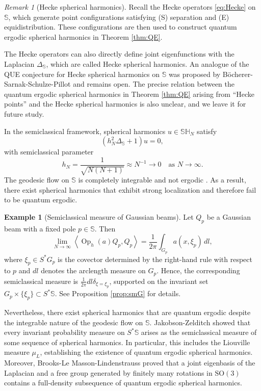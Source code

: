 \documentclass[12pt,reqno]{amsart}
\DeclareMathOperator{\Op}{Op}
\newcommand{\Sb}{\mathbb{S}}
\newcommand{\SH}{\mathbb{SH}}
\newcommand{\SO}{\mathrm{SO}}
\theoremstyle{plain}
\theoremstyle{definition}
\newtheorem*{ex}{Example}
\theoremstyle{remark}
\newtheorem*{rmk}{Remark}
\numberwithin{equation}{section}
\begin{document}
\begin{rmk}[Hecke spherical harmonics]
Recall the Hecke operators \eqref{eq:Hecke} on $\Sb$, which generate point configurations satisfying (S) separation and (E) equidistribution. These configurations are then used to construct quantum ergodic spherical harmonics in Theorem \ref{thm:QE}.

The Hecke operators can also directly define joint eigenfunctions with the Laplacian $\Delta_\Sb$, which are called Hecke spherical harmonics. An analogue of the QUE conjecture for Hecke spherical harmonics on $\Sb$ was proposed by B\"ocherer-Sarnak-Schulze-Pillot \cite[Conjecture 1]{BSSP} and remains open. The precise relation between the quantum ergodic spherical harmonics in Theorem \ref{thm:QE} arising from ``Hecke points'' and the Hecke spherical harmonics is also unclear, and we leave it for future study.
\end{rmk}

In the semiclassical framework, spherical harmonics $u\in\SH_N$ satisfy
$$\left(h_N^2\Delta_{\Sb}+1\right)u=0,$$ 
with semiclassical parameter
$$h_N=\frac{1}{\sqrt{N(N+1)}}\approx N^{-1}\to0\quad\text{as }N\to\infty.$$ 
The geodesic flow on $\Sb$ is completely integrable and not ergodic \cite{KH}. As a result, there exist spherical harmonics that exhibit strong localization and therefore fail to be quantum ergodic.

\begin{ex}[Semiclassical measure of Gaussian beams]
Let $Q_p$ be a Gaussian beam with a fixed pole $p\in\Sb$. Then
$$\lim_{N\to\infty}\left\langle\Op_h(a)Q_p,Q_p\right\rangle=\frac{1}{2\pi}\int_{G_p}a\left(x,\xi_p\right)\,dl,$$
where $\xi_p\in S^*G_p$ is the covector determined by the right-hand rule with respect to $p$ and $dl$ denotes the arclength measure on $G_p$. Hence, the corresponding semiclassical measure is $\frac{1}{2\pi}dl\delta_{\xi=\xi_p}$, supported on the invariant set $G_p\times\{\xi_p\}\subset S^*\Sb$. See Proposition \ref{prop:smG} for details.
\end{ex}

Nevertheless, there exist spherical harmonics that are quantum ergodic despite the integrable nature of the geodesic flow on $\Sb$. Jakobson-Zelditch \cite{JZ} showed that every invariant probability measure on $S^*\Sb$ arises as the semiclassical measure of some sequence of spherical harmonics. In particular, this includes the Liouville measure $\mu_L$, establishing the existence of quantum ergodic spherical harmonics. Moreover, Brooks-Le Masson-Lindenstrauss \cite{BLML} proved that a joint eigenbasis of the Laplacian and a free group generated by finitely many rotations in $\SO(3)$ contains a full-density subsequence of quantum ergodic spherical harmonics.
\end{document}
